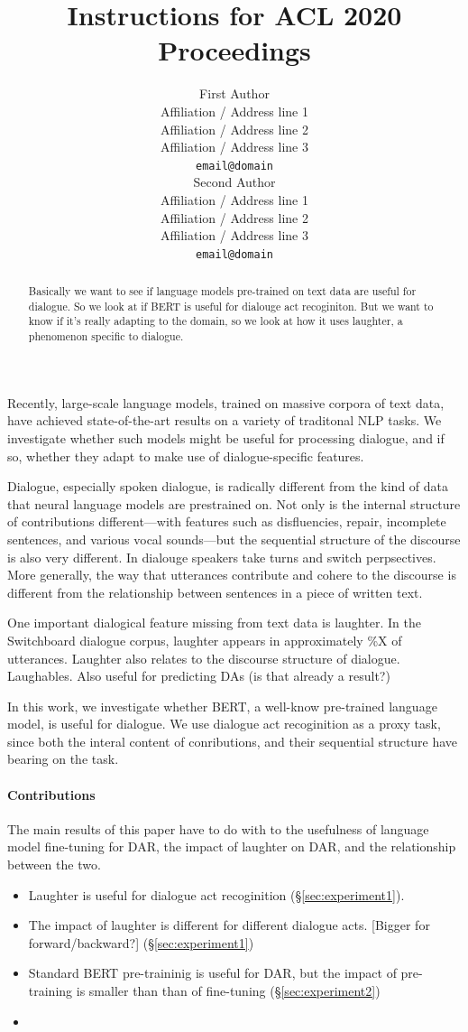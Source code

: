 \documentclass[11pt,a4paper]{article}
\title{Instructions for ACL 2020 Proceedings}
\author{First Author \\
  Affiliation / Address line 1 \\
  Affiliation / Address line 2 \\
  Affiliation / Address line 3 \\
  \texttt{email@domain} \\\And
  Second Author \\
  Affiliation / Address line 1 \\
  Affiliation / Address line 2 \\
  Affiliation / Address line 3 \\
  \texttt{email@domain} \\}
\date{}
\begin{document}
\maketitle
\begin{abstract}
  Basically we want to see if language models pre-trained on text data are useful for dialogue.
  So we look at if BERT is useful for dialouge act recoginiton.
  But we want to know if it's really adapting to the domain, so we look at how it uses laughter, a phenomenon specific to dialogue.
\end{abstract}


Recently, large-scale language models, trained on massive corpora of text data, have achieved state-of-the-art results on a variety of traditonal NLP tasks.
We investigate whether such models might be useful for processing dialogue, and if so, whether they adapt to make use of dialogue-specific features.

Dialogue, especially spoken dialogue, is radically different from the kind of data that neural language models are prestrained on.
Not only is the internal structure of contributions different---with features such as disfluencies, repair, incomplete sentences, and various vocal sounds---but the sequential structure of the discourse is also very different.
In dialouge speakers take turns and switch perpsectives.
More generally, the way that utterances contribute and cohere to the discourse is different from the relationship between sentences in a piece of written text.

One important dialogical feature missing from text data is laughter.
In the Switchboard dialogue corpus, laughter appears in approximately \%X of utterances.
Laughter also relates to the discourse structure of dialogue. 
Laughables.
Also useful for predicting DAs (is that already a result?)

In this work, we investigate whether BERT, a well-know pre-trained language model, is useful for dialogue.
We use dialogue act recoginition as a proxy task, since both the interal content of conributions, and their sequential structure have bearing on the task.

\paragraph{Contributions}
The main results of this paper have to do with to the usefulness of language model fine-tuning for DAR, 
the impact of laughter on DAR, and the relationship between the two.
\begin{itemize}
  \item Laughter is useful for dialogue act recoginition (\S\ref{sec:experiment1}).
  \item The impact of laughter is different for different dialogue acts. [Bigger for forward/backward?] (\S\ref{sec:experiment1})
  \item Standard BERT pre-traininig is useful for DAR, but the impact of pre-training is smaller than than of fine-tuning (\S\ref{sec:experiment2})
  \item 
\end{itemize}
\end{document}
